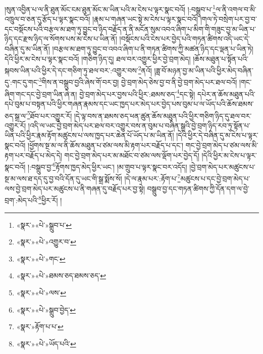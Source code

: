 །སུན་འབྱིན་པ་ལ་ནི་ཐུན་མོང་ངམ་ཐུན་མོང་མ་ཡིན་པའི་མ་ངེས་པ་ལྟར་སྣང་བའོ། །:བསྒྲུབ་པ་\footnote{«སྣར་»«པེ་»སྒྲུབ་པ་}ལ་ནི་འགལ་བ་མི་འཁྲུལ་བ་ཅན་དུ་རྩོད་པ་ལྟར་སྣང་བའོ། །རྣམ་པ་གཞན་ཡང་སྟེ་མ་ངེས་པ་ལྟར་སྣང་བའོ། །གལ་ཏེ་བསྲེག་པར་བྱ་བ་དང་བསྡོངས་པའི་བརྩལ་མ་ཐག་ཏུ་བྱུང་བ་ཉིད་བརྗོད་ན་ནི་མངོན་སུམ་འབའ་ཞིག་པ་མིག་གི་གཟུང་བྱ་མ་ཡིན་པ་ཉིད་དང་རྫས་ཉིད་ལ་སོགས་པས་མ་ངེས་པ་ཡིན་ནོ། །བསྡོངས་པའི་ངེས་པར་བྱེད་པའི་གཏན་ཚིགས་འདི་ཡང་དེ་བཞིན་དུ་མ་ཡིན་ནོ། །བརྩལ་མ་ཐག་ཏུ་བྱུང་བ་འབའ་ཞིག་པ་ནི་གཏན་ཚིགས་ཀྱི་མཚན་ཉིད་དང་ལྡན་པ་ཡིན་ཏེ། དེའི་ཕྱིར་མ་ངེས་པ་ལྟར་སྣང་བའོ། །གཅིག་ཉིད་དུ། ཐལ་བར་འགྱུར་ཕྱིར་བྱེ་བྲག་མེད། །ཆོས་མཐུན་པ་སྟོན་པའི་སྐབས་ཡིན་པའི་ཕྱིར་དེ་དང་གཅིག་ཏུ་ཐལ་བར་:འགྱུར་བས་\footnote{«སྣར་»«པེ་»འགྱུར་བ་}ནའོ། །ཟླ་བོ་མཉན་བྱ་མ་ཡིན་པའི་ཕྱིར་མེད་བཞིན་དུ་:གང་དུ་གང་\footnote{«སྣར་»«པེ་»གང་}གིས་ན་བསྒྲུབ་བྱའི་ཞེས་གོ་བར་བྱ། བྱེ་བྲག་མེད་ཅེས་བྱ་བ་ནི་བྱེ་བྲག་མེད་པར་ཐལ་བའོ། །གང་ཞིག་གང་དང་བྱེ་བྲག་ཡིན་ཞེ་ན། བྱེ་བྲག་མེད་པར་བྱས་པའི་ཕྱིར་:ཐམས་ཅད་\footnote{«སྣར་»«པེ་»ཐམས་ཅད་ཐམས་ཅད་}དང་སྟེ། དཔེར་ན་ཆོས་མཐུན་པའི་དཔེ་བུམ་པ་བསྟན་པའི་ཕྱིར་གཞན་རྣམས་དང་ཡང་ཁྱད་པར་མེད་པར་བྱེད་པས་བུམ་པ་ལ་ཡོད་པའི་ཆོས་ཐམས་ཅད་སྒྲ་ལ་\footnote{«སྣར་»«པེ་»ལས་}ཐོབ་པར་འགྱུར་རོ། །དེ་ལྟ་བས་ན་ཐམས་ཅད་ཕན་ཚུན་ཆོས་མཐུན་པའི་ཕྱིར་གཅིག་ཉིད་དུ་ཐལ་བར་འགྱུར་རོ། །འདི་ལ་ཡང་བྱེ་བྲག་མེད་པར་ཐལ་བར་འགྱུར་བས་ན་བུམ་པ་བཞིན་སྒྲའི་བྱེ་བྲག་ཉིད་རབ་ཏུ་སྟོན་པ་ཡིན་པའི་ཕྱིར་རྣམ་རྟོག་མཚུངས་པ་ལས་ཁྱད་པར་ཆེན་པོ་ཡོད་པ་མ་ཡིན་ནོ། །དེའི་ཕྱིར་དེ་བཞིན་དུ་མ་ངེས་པ་ལྟར་སྣང་བའོ། །ཕྱོགས་སྔ་མ་ལ་ནི་ཆོས་མཐུན་པ་ཙམ་ལས་མི་རྟག་པར་བརྗོད་པ་དང་། གང་བྱེ་བྲག་མེད་པ་ཙམ་ལས་མི་རྟག་པར་བརྗོད་པ་མེད་དེ། གང་བྱེ་བྲག་མེད་པར་མ་མཐོང་བ་ཙམ་ལས་ལྡོག་པར་བྱེད་དོ། །དེའི་ཕྱིར་མ་ངེས་པ་ལྟར་སྣང་བའོ། །:བསྒྲུབ་བྱ་\footnote{«སྣར་»«པེ་»སྒྲུབ་བྱེད་}རྟོགས་ཁྱད་མེད་ཕྱིར་ཡང་། །མ་གྲུབ་པ་ལྟར་སྣང་བར་འདོད། །བྱེ་བྲག་མེད་པར་མཚུངས་པ་སྔ་མ་ལས་ཐ་དད་དུ་བྱ་བའི་དོན་དུ་ཡང་གི་སྒྲ་སྨོས་སོ། །དེ་ལ་རྣམ་པར་:རྟོག་པ་\footnote{«སྣར་»རྟོག་པ་པ་}མཚུངས་པ་དང་བྱེ་བྲག་མེད་པ་ལས་བྱེ་བྲག་མེད་པར་མཚུངས་པ་ནི་གཞན་དུ་བརྗོད་པར་བྱ་སྟེ། བསྒྲུབ་བྱ་དང་གཏན་ཚིགས་ཀྱི་དོན་དག་ལ་བྱེ་བྲག་:མེད་པའི་\footnote{«སྣར་»«པེ་»ཡོད་པའི་}ཕྱིར་རོ། །
